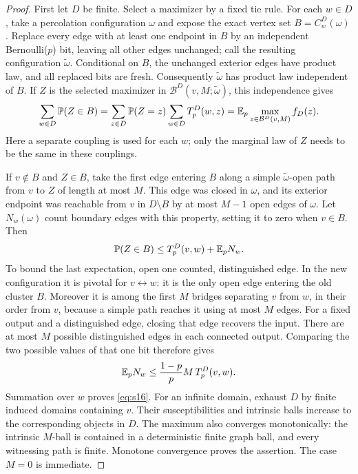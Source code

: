 \begin{proof}
First let $D$ be finite.  Select a maximizer by a fixed tie rule.  For
each $w\in D$, take a percolation configuration $\omega$ and expose the
exact vertex set $B=C_w^D(\omega)$.  Replace every edge with at least one
endpoint in $B$ by an independent Bernoulli($p$) bit, leaving all other
edges unchanged; call the resulting configuration $\widetilde\omega$.
Conditional on $B$, the unchanged exterior edges have product law,
and all replaced bits are fresh.  Consequently $\widetilde\omega$ has
product law independent of $B$.  If $Z$ is the selected maximizer in
$\mathcal B^D(v,M;\widetilde\omega)$, this independence gives
\[
 \sum_{w\in D}\mathbb P(Z\in B)
 =\sum_{z\in D}\mathbb P(Z=z)\sum_{w\in D}T_p^D(w,z)
 =\mathbb E_p\max_{z\in\mathcal B^D(v,M)}f_D(z).
\]
Here a separate coupling is used for each $w$; only the marginal law of
$Z$ needs to be the same in these couplings.

If $v\notin B$ and $Z\in B$, take the first edge entering $B$ along
a simple $\widetilde\omega$-open path from $v$ to $Z$ of length at most
$M$.  This edge was closed in $\omega$, and its exterior endpoint was
reachable from $v$ in $D\setminus B$ by at most $M-1$ open edges of
$\omega$.  Let $N_w(\omega)$ count boundary edges with this property,
setting it to zero when $v\in B$.  Then
\[
 \mathbb P(Z\in B)\le T_p^D(v,w)+\mathbb E_p N_w.
\]
To bound the last expectation, open one counted, distinguished edge.
In the new configuration it is pivotal for $v\leftrightarrow w$:
it is the only open edge entering the old cluster $B$.  Moreover it is
among the first $M$ bridges separating $v$ from $w$, in their order
from $v$, because a simple path reaches it using at most $M$ edges.
For a fixed output and a distinguished edge, closing that edge
recovers the input.  There are at most $M$ possible distinguished
edges in each connected output.  Comparing the two possible values
of that one bit therefore gives
\[
 \mathbb E_p N_w\le \frac{1-p}{p}M\,T_p^D(v,w).
\]
Summation over $w$ proves \eqref{eq:s16}.  For an infinite domain,
exhaust $D$ by finite induced domains containing $v$.  Their
susceptibilities and intrinsic balls increase to the corresponding
objects in $D$.  The maximum also converges monotonically: the
intrinsic $M$-ball is contained in a deterministic finite graph ball,
and every witnessing path is finite.  Monotone convergence proves
the assertion.  The case $M=0$ is immediate.
\end{proof}

